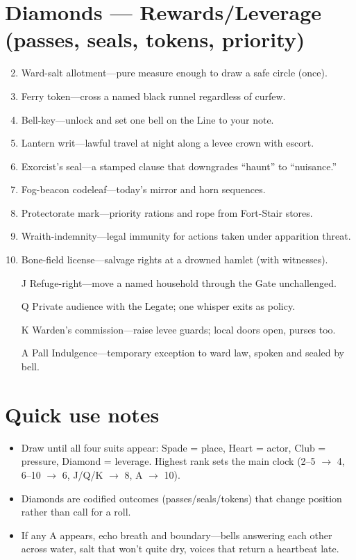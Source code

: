 \section*{Diamonds --- Rewards/Leverage (passes, seals, tokens, priority)}
\label{sec:mistlands-rewards}
\begin{enumerate}
\setcounter{enumi}{1}
\item Ward-salt allotment---pure measure enough to draw a safe circle (once).
\item Ferry token---cross a named black runnel regardless of curfew.
\item Bell-key---unlock and set one bell on the Line to your note.
\item Lantern writ---lawful travel at night along a levee crown with escort.
\item Exorcist's seal---a stamped clause that downgrades ``haunt'' to ``nuisance.''
\item Fog-beacon codeleaf---today's mirror and horn sequences.
\item Protectorate mark---priority rations and rope from Fort-Stair stores.
\item Wraith-indemnity---legal immunity for actions taken under apparition threat.
\item Bone-field license---salvage rights at a drowned hamlet (with witnesses).
\item[J] Refuge-right---move a named household through the Gate unchallenged.
\item[Q] Private audience with the Legate; one whisper exits as policy.
\item[K] Warden's commission---raise levee guards; local doors open, purses too.
\item[A] Pall Indulgence---temporary exception to ward law, spoken and sealed by bell.
\end{enumerate}

\section*{Quick use notes}
\label{sec:mistlands-quick-use}
\begin{itemize}
\item Draw until all four suits appear: Spade = place, Heart = actor, Club = pressure, Diamond = leverage. Highest rank sets the main clock (2--5 $\rightarrow$ 4, 6--10 $\rightarrow$ 6, J/Q/K $\rightarrow$ 8, A $\rightarrow$ 10).
\item Diamonds are codified outcomes (passes/seals/tokens) that change position rather than call for a roll.
\item If any A appears, echo breath and boundary---bells answering each other across water, salt that won't quite dry, voices that return a heartbeat late.
\end{itemize}

